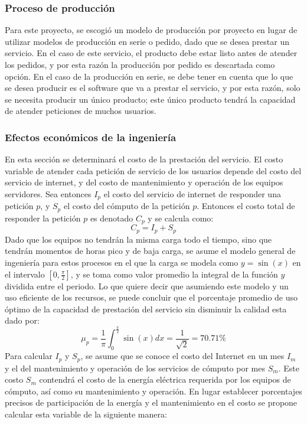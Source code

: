 \documentclass[a4paper, 12pt, oneside]{article}
\begin{document}
	\subsubsection{Proceso de producción}
	Para este proyecto, se escogió un modelo de producción por proyecto en lugar de utilizar modelos de producción en serie o pedido, dado que se desea prestar un servicio. En el caso de este servicio, el producto debe estar listo antes de atender los pedidos, y por esta razón la producción por pedido es descartada como opción. En el caso de la producción en serie, se debe tener en cuenta que lo que se desea producir es el software que va a prestar el servicio, y por esta razón, solo se necesita producir un único producto; este único producto tendrá la capacidad de atender peticiones de muchos usuarios.

	\subsubsection{Efectos económicos de la ingeniería}
	En esta sección se determinará el costo de la prestación del servicio. El costo variable de atender cada petición de servicio de los usuarios depende del costo del servicio de internet, y del costo de mantenimiento y operación de los equipos servidores.\newline
	Sea entonces $I_p$ el costo del servicio de internet de responder una petición $p$, y $S_p$ el costo del cómputo de la petición $p$. Entonces el costo total de responder la petición $p$ es denotado $C_p$ y se calcula como:
	\begin{equation}
		C_p = I_p + S_p
		\label{eq:opCost}
	\end{equation}
	Dado que los equipos no tendrán la misma carga todo el tiempo, sino que tendrán momentos de horas pico y de baja carga, se asume el modelo general de ingeniería para estos procesos en el que la carga se modela como $y=\sin(x)$ en el intervalo $[0,\frac{\pi}{2}]$, y se toma como valor promedio la integral de la función $y$ dividida entre el periodo. Lo que quiere decir que asumiendo este modelo y un uso eficiente de los recursos, se puede concluir que el porcentaje promedio de uso óptimo de la capacidad de prestación del servicio sin disminuir la calidad esta dado por:
	\[ \mu_p=\frac{1}{\pi}\int_0^{\frac{\pi}{2}}{\sin(x)dx} = \frac{1}{\sqrt{2}} = 70.71\% \]
	Para calcular $I_p$ y $S_p$, se asume que se conoce el costo del Internet en un mes $I_m$ y el del mantenimiento y operación de los servicios de cómputo por mes $S_m$. Este costo $S_m$ contendrá el costo de la energía eléctrica requerida por los equipos de cómputo, así como su mantenimiento y operación. En lugar establecer porcentajes precisos de participación de la energía y el mantenimiento en el costo se propone calcular esta variable de la siguiente manera:
\end{document}
